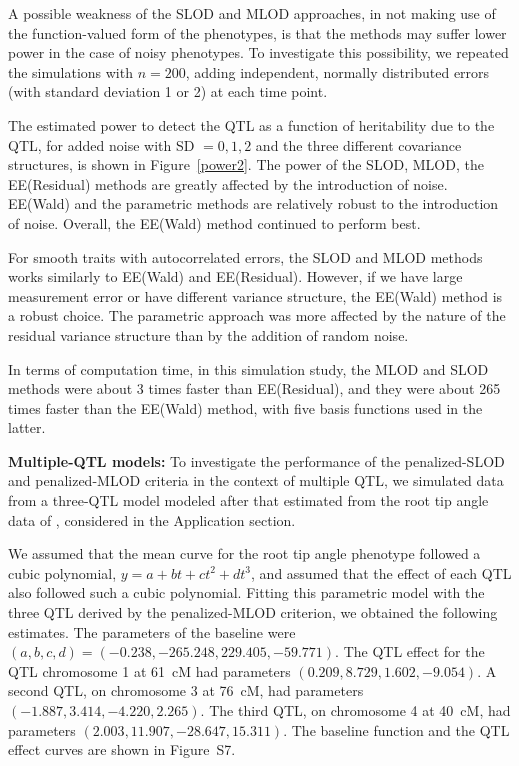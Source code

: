 \documentclass[12pt,letterpaper]{article}
\begin{document}
A possible weakness of the SLOD and MLOD approaches, in not making
use of the function-valued form of the phenotypes, is that the methods
may suffer lower power in the case of noisy phenotypes. To investigate
this possibility, we repeated the simulations with $n=200$, adding
independent, normally distributed errors (with standard deviation 1 or
2) at each time point.

The estimated power to detect the QTL as a function of heritability
due to the QTL, for added noise with SD $=0, 1, 2$ and the three
different covariance structures, is shown in Figure~\ref{power2}.
The power of the SLOD, MLOD, the EE(Residual) methods are greatly
affected by the introduction of noise. EE(Wald) and the parametric
methods are relatively robust to the introduction of noise.
Overall, the EE(Wald) method continued to perform best.

For smooth traits with autocorrelated errors, the SLOD and MLOD
methods works similarly to EE(Wald) and EE(Residual). However, if we
have large measurement error or have different variance structure, the
EE(Wald) method is a robust choice. The parametric approach was more
affected by the nature of the residual variance structure than by the
addition of random noise.

In terms of computation time, in this simulation study, the MLOD and
SLOD methods were about 3 times faster than EE(Residual), and they
were about 265 times faster than the EE(Wald) method, with five basis
functions used in the latter.


\textbf{Multiple-QTL models:}
To investigate the performance of the penalized-SLOD and
penalized-MLOD criteria in the context of multiple QTL,
we simulated data from a three-QTL model modeled after that estimated
from the root tip angle data of \citet{Moore2013}, considered in the
Application section.

We assumed that the mean curve for the root tip angle phenotype
followed a cubic polynomial, $y = a + b t + c t^2 + d t^3$,
and assumed that the effect of each QTL also followed such a cubic
polynomial. Fitting this parametric model with the three QTL derived
by the penalized-MLOD criterion, we obtained the following estimates.
The parameters of the baseline were
$(a,b,c,d) = (-0.238, -265.248, 229.405, -59.771)$.
The QTL effect for the QTL chromosome 1 at 61~cM
had parameters $(0.209, 8.729, 1.602, -9.054)$.
A second QTL, on chromosome 3 at 76~cM, had parameters
$(-1.887, 3.414, -4.220, 2.265)$. The third QTL, on chromosome 4 at
40~cM, had parameters $(2.003, 11.907, -28.647, 15.311)$.
The baseline function and the QTL effect curves are shown in Figure~S7.
\end{document}

